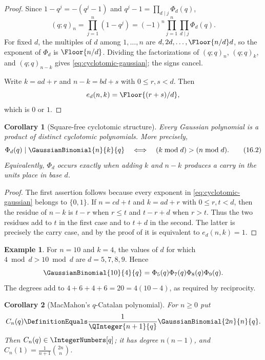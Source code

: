 \documentclass[11pt,a4paper,oneside,openany]{book}
\newtheorem{corollary}[corollary]{Corollary}
\theoremstyle{definition}
\newtheorem{example}[example]{Example}
\theoremstyle{remark}
\begin{document}
\begin{proof}
Since $1-q^j=-(q^j-1)$ and $q^j-1=\prod_{d\mid j}\Phi_d(q)$,
\[
 (q;q)_n
 =\prod_{j=1}^{n}(1-q^j)
 =(-1)^n\prod_{j=1}^{n}\prod_{d\mid j}\Phi_d(q).
\]
For fixed $d$, the multiples of $d$ among $1,\ldots,n$ are $d,2d,\ldots,\Floor{n/d}d$, so the exponent of $\Phi_d$ is $\Floor{n/d}$.  Dividing the factorizations of $(q;q)_n$, $(q;q)_k$, and $(q;q)_{n-k}$ gives \eqref{eq:cyclotomic-gaussian}; the signs cancel.

Write $k=ad+r$ and $n-k=bd+s$ with $0\le r,s<d$.  Then
\[
 e_d(n,k)=\Floor{(r+s)/d},
\]
which is $0$ or $1$.
\end{proof}

\begin{corollary}[Square-free cyclotomic structure]\label{cor:squarefree-cyclotomic}
Every Gaussian polynomial is a product of distinct cyclotomic polynomials.  More precisely,
\[
 \Phi_d(q)\mid\GaussianBinomial{n}{k}{q}
 \quad\Longleftrightarrow\quad
 (k\bmod d)> (n\bmod d).
 \tag{16.2}\label{eq:carry-criterion}
\]
Equivalently, $\Phi_d$ occurs exactly when adding $k$ and $n-k$ produces a carry in the units place in base $d$.
\end{corollary}

\begin{proof}
The first assertion follows because every exponent in \eqref{eq:cyclotomic-gaussian} belongs to $\{0,1\}$.  If $n=cd+t$ and $k=ad+r$ with $0\le r,t<d$, then the residue of $n-k$ is $t-r$ when $r\le t$ and $t-r+d$ when $r>t$.  Thus the two residues add to $t$ in the first case and to $t+d$ in the second.  The latter is precisely the carry case, and by the proof of  it is equivalent to $e_d(n,k)=1$.
\end{proof}

\begin{example}
For $n=10$ and $k=4$, the values of $d$ for which $4\bmod d>10\bmod d$ are $d=5,7,8,9$.  Hence
\[
 \GaussianBinomial{10}{4}{q}=\Phi_5(q)\Phi_7(q)\Phi_8(q)\Phi_9(q).
\]
The degrees add to $4+6+4+6=20=4(10-4)$, as required by reciprocity.
\end{example}

\begin{corollary}[MacMahon's $q$-Catalan polynomial]\label{cor:q-catalan}
For $n\ge0$ put
\[
 C_n(q)\DefinitionEquals\frac1{\QInteger{n+1}{q}}\GaussianBinomial{2n}{n}{q}.
\]
Then $C_n(q)\in\IntegerNumbers[q]$; it has degree $n(n-1)$, and $C_n(1)=\frac1{n+1}\binom{2n}{n}$.
\end{corollary}
\end{document}
